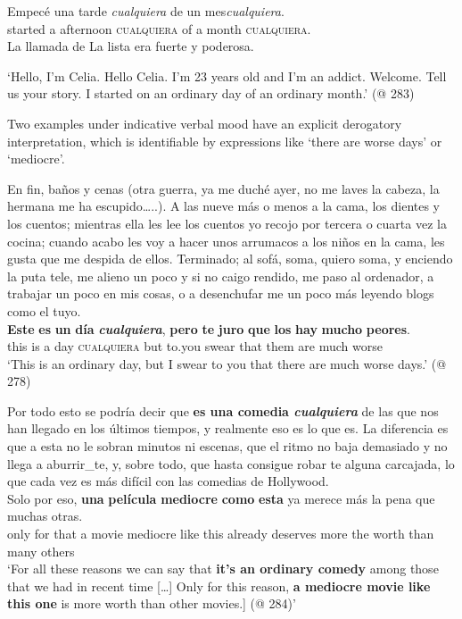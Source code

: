      \gll Empecé una tarde \textit{cualquiera} de un mes\textit{cualquiera}.\\ 
     started a afternoon \textsc{cualquiera} of a month \textsc{cualquiera}.\\
     
    La llamada de La lista era fuerte y poderosa.
    
    \glt ‘Hello, I'm Celia. Hello Celia. I'm 23 years old and I'm an addict. Welcome. Tell us your story. I started on an ordinary day of an ordinary month.' 
    (@ 283)  
\z	

{Two examples under indicative verbal mood have an explicit derogatory interpretation, which is identifiable by expressions like ‘there are worse days’ or ‘mediocre’.}

\ea \label{ex:key:En } %
       En fin, baños y cenas (otra guerra, ya me duché ayer, no me laves la cabeza, la hermana me ha escupido…..). A las nueve más o menos a la cama, los dientes y los cuentos; mientras ella les lee los cuentos yo recojo por tercera o cuarta vez la cocina; cuando acabo les voy a hacer unos arrumacos a los niños en la cama, les gusta que me despida de ellos. Terminado; al sofá, soma, quiero soma, y enciendo la puta tele, me alieno un poco y si no caigo rendido, me paso al ordenador, a trabajar un poco en mis cosas, o a desenchufar me un poco más leyendo blogs como el tuyo.\\
     \gll \textbf{Este} \textbf{es} \textbf{un} \textbf{día} \textbf{\textit{cualquiera}}, \textbf{pero} \textbf{te} \textbf{juro} \textbf{que} \textbf{los} \textbf{hay} \textbf{mucho} \textbf{peores}.\\
     this is a day \textsc{cualquiera} but to.you swear that them are much worse\\
    \glt ‘This is an ordinary day, but I swear to you that there are much worse days.' (@ 278)  
\z

\ea \label{ex:key:Por}
      Por todo esto se podría decir que \textbf{es una comedia \textit{cualquiera}} de las que nos han llegado en los últimos tiempos, y realmente eso es lo que es. La diferencia es que a esta no le sobran minutos ni escenas, que el ritmo no baja demasiado y no llega a aburrir\_te, y, sobre todo, que hasta consigue robar te alguna carcajada, lo que cada vez es más difícil con las comedias de Hollywood.\\
     \gll Solo por eso, \textbf{una} \textbf{película} \textbf{mediocre} \textbf{como} \textbf{esta} ya merece más la pena que muchas otras.\\
only for that a movie mediocre like this already deserves more the worth than many others\\
    \glt ‘For all these reasons we can say that \textbf{it's an ordinary comedy} among those that we had in recent time […] Only for this reason, \textbf{a mediocre movie like this one} is more worth than other movies.] (@ 284)’
\z

